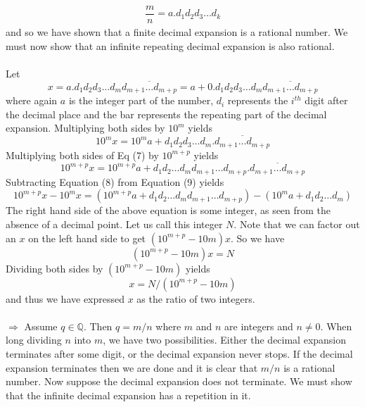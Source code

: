 \documentclass[12pt]{article}
\begin{document}
\begin{enumerate}
\begin{align*}
\dfrac{m}{n} = a \textbf{.} d_{1} d_{2} d_{3} \ldots d_{k}
\end{align*}
and so we have shown that a finite decimal expansion is a rational number. We must now show that an infinite repeating decimal expansion is also rational. \\ \\
Let \begin{equation}
x=a \textbf{.} d_{1} d_{2} d_{3} \ldots d_{m} \overline{d_{m+1} \ldots d_{m+p}} = a + 0 \textbf{.} d_{1} d_{2} d_{3} \ldots d_{m} \overline{d_{m+1} \ldots d_{m+p}}
\end{equation}where again $a$ is the integer part of the number, $d_{i}$ represents the $i^{th}$ digit after the decimal place and the bar represents the repeating part of the decimal expansion. Multiplying both sides by $10^{m}$ yields
\begin{equation}
10^{m}x = 10^{m}a + d_{1}d_{2}d_{3} \ldots  d_{m} \textbf{.} \overline{d_{m+1} \ldots d_{m+p}} 
\end{equation}
Multiplying both sides of Eq (7) by $10^{m+p}$ yields 
\begin{equation}
10^{m+p}x= 10^{m+p}a + d_{1} d_{2} \ldots d_{m} d_{m+1} \ldots d_{m+p} \textbf{.} \overline{d_{m+1} \ldots d_{m+p}}
\end{equation}
Subtracting Equation (8) from Equation (9) yields
\begin{equation}
10^{m+p}x-10^{m}x = (10^{m+p}a +d_{1} d_{2} \ldots d_{m} d_{m+1} \ldots d_{m+p}) - (10^{m}a + d_{1} d_{2} \ldots d_{m})
\end{equation}
The right hand side of the above equation is some integer, as seen from the absence of a decimal point. Let us call this integer $N$. Note that we can factor out an $x$ on the left hand side to get $(10^{m+p} - 10{m})x$. So we have
\begin{equation}
(10^{m+p} - 10{m})x = N
\end{equation}
Dividing both sides by $(10^{m+p} - 10{m})$ yields
\begin{equation}
x = N/(10^{m+p} - 10{m})
\end{equation}
and thus we have expressed $x$ as the ratio of two integers. \\ \\

$\Rightarrow $ Assume $q \in \mathbb{Q}$. Then $q= m/n$ where $m$ and $n$ are integers and $n \neq 0$. When long dividing $n$ into $m$, we have two possibilities. Either the decimal expansion terminates after some digit, or the decimal expansion never stops. If the decimal expansion terminates then we are done and it is clear that $m/n$ is a rational number. Now suppose the decimal expansion does not terminate. We must show that the infinite decimal expansion has a repetition in it. \\ \\ 


\end{enumerate}
\end{document}
